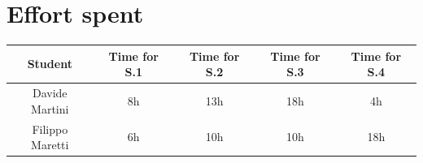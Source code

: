 \section{Effort spent}
\begin{tabular}{ | c || c | c | c | c|}
    \hline
    Student             & Time for S.1 & Time for S.2 & Time for S.3 & Time for S.4 \\ \hline
    Davide Martini  & 8h           & 13h  & 18h          & 4h           \\ \hline
    Filippo Maretti   &  6h         & 10h  &   10h      &   18h         \\ 
    \hline
\end{tabular}